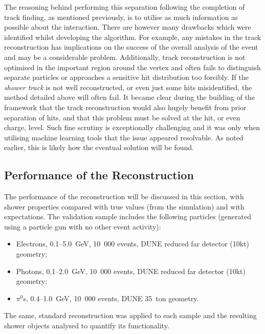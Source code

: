 The reasoning behind performing this separation following the completion of track finding, as mentioned previously, is to utilise as much information as possible about the interaction.  There are however many drawbacks which were identified whilst developing the algorithm.  For example, any mistakes in the track reconstruction has implications on the success of the overall analysis of the event and may be a considerable problem.  Additionally, track reconstruction is not optimised in the important region around the vertex and often fails to distinguish separate particles or approaches a sensitive hit distribution too forcibly.  If the \textit{shower track} is not well reconstructed, or even just some hits misidentified, the method detailed above will often fail.  It became clear during the building of the framework that the track reconstruction would also hugely benefit from prior separation of hits, and that this problem must be solved at the hit, or even charge, level.  Such fine scrutiny is exceptionally challenging and it was only when utilising machine learning tools that the issue appeared resolvable.  As noted earlier, this is likely how the eventual solution will be found.

\subsection{Performance of the Reconstruction}\label{sec:ReconstructionPerformance}

The performance of the reconstruction will be discussed in this section, with shower properties compared with true values (from the simulation) and with expectations.  The validation sample includes the following particles (generated using a particle gun with no other event activity):
\begin{itemize}
  \item Electrons, 0.1--5.0~GeV, 10~000 events, DUNE reduced far detector (10kt) geometry;
  \item Photons, 0.1--2.0~GeV, 10~000 events, DUNE reduced far detector (10kt) geometry;
  \item $\pi^0$s, 0.4--1.0~GeV, 10~000 events, DUNE 35~ton geometry.
\end{itemize}
The same, standard reconstruction was applied to each sample and the resulting shower objects analysed to quantify its functionality.

